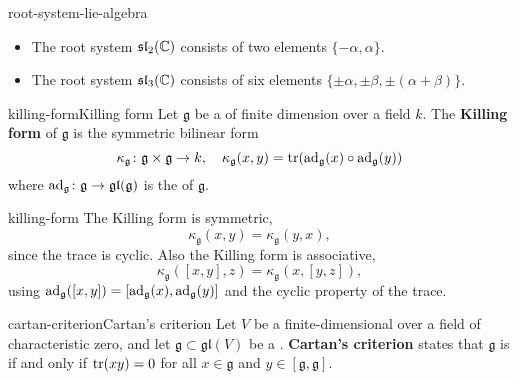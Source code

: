 \begin{example}{root-system-lie-algebra}
    \begin{itemize}
        \item The root system $\mathfrak{sl}_2(\mathbb{C})$ consists of two elements $\{ -\alpha, \alpha \}$.
        \item The root system $\mathfrak{sl}_3(\mathbb{C})$ consists of six elements $\{ \pm \alpha, \pm \beta, \pm (\alpha + \beta) \}$.
    \end{itemize}
\end{example}

\begin{topic}{killing-form}{Killing form}
    Let $\mathfrak{g}$ be a  of finite dimension over a field $k$. The \textbf{Killing form} of $\mathfrak{g}$ is the symmetric bilinear form
    \[ \kappa_\mathfrak{g} \colon \mathfrak{g} \times \mathfrak{g} \to k, \quad \kappa_\mathfrak{g}(x, y) = \textup{tr}(\textup{ad}_{\mathfrak{g}}(x) \circ \textup{ad}_{\mathfrak{g}}(y)) \]
    where $\textup{ad}_\mathfrak{g} \colon \mathfrak{g} \to \mathfrak{gl}(\mathfrak{g})$ is the  of $\mathfrak{g}$.
\end{topic}

\begin{example}{killing-form}
    The Killing form is symmetric,
    \[ \kappa_\mathfrak{g}(x, y) = \kappa_\mathfrak{g}(y, x) , \]
    since the trace is cyclic. Also the Killing form is associative,
    \[ \kappa_\mathfrak{g}([x, y], z) = \kappa_\mathfrak{g}(x, [y, z]) , \]
    using $\textup{ad}_\mathfrak{g}([x, y]) = [\textup{ad}_\mathfrak{g}(x), \textup{ad}_\mathfrak{g}(y)]$ and the cyclic property of the trace.
\end{example}

\begin{topic}{cartan-criterion}{Cartan's criterion}
    Let $V$ be a finite-dimensional  over a field of characteristic zero, and let $\mathfrak{g} \subset \mathfrak{gl}(V)$ be a . \textbf{Cartan's criterion} states that $\mathfrak{g}$ is  if and only if $\operatorname{tr}(xy) = 0$ for all $x \in \mathfrak{g}$ and $y \in [\mathfrak{g}, \mathfrak{g}]$.
\end{topic}

